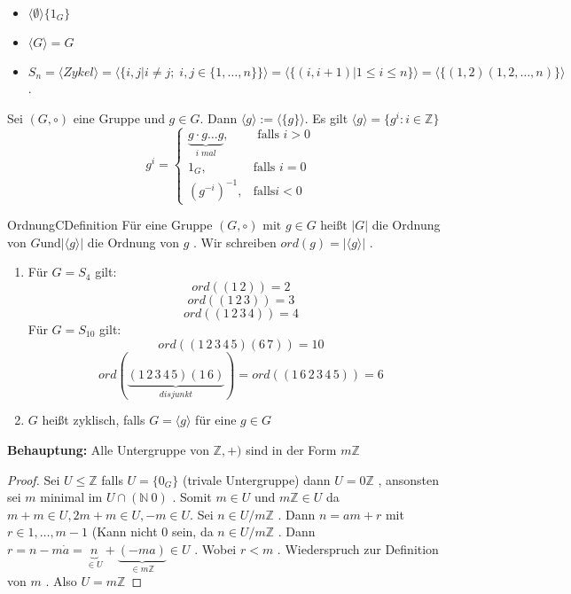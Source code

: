 \documentclass[a4paper]{memoir}
\begin{document}
\begin{itemize}

    \item $ \langle \emptyset  \rangle \{1_G\} $
    \item $ \langle G \rangle = G $
    \item $ S_n = \langle Zykel \rangle = \langle \{ i,j | i \neq j ; \;  i,j \in \{1,\dots,n\}\} \rangle = \langle \{(i,i+1)|1 \leq i \leq n\} \rangle = \langle \{(1,2)(1,2,\dots ,n)\} \rangle $ . 
\end{itemize}
\vspace{2em}
        Sei $ (G, \circ) $ eine Gruppe und $ g \in G $. Dann $ \langle g \rangle := \langle \{g\} \rangle  $. Es gilt $ \langle g \rangle = \{g^i:i \in \mathbb{Z}\} $ 
            $$ g^i = \begin{cases}
                \underbrace{ g \cdot g \dots g}_{i\; mal}, & \text{ falls } i > 0 \\
                1_G, & \text{falls } i = 0 \\
                (g^{-i})^{-1},& \text{falls} i<0    
            \end{cases}
             $$ 
\begin{ibox}{1.8}{Ordnung}{CDefinition}
    Für eine Gruppe $ (G, \circ) \text{ mit } g \in G \text{ heißt } |G| $ die Ordnung von $ G \text{und} | \langle g \rangle |  $ die Ordnung von $ g $ . Wir schreiben $ ord(g) = | \langle g \rangle | $ . 
\end{ibox}
\begin{enumerate}[label=\alph*)]
    \item Für $ G=S_4 $ gilt:
        $$ ord((1\,2))=2 $$
        $$ ord((1\,2\,3)) = 3 $$
        $$ ord((1\,2\,3\,4)) = 4 $$
        Für $ G=S_{10} $ gilt:
         $$ ord((1\,2\,3\,4\,5)(6\,7))=10 $$
         $$ ord(\underbrace{ (1\,2\,3\,4\,5)(1\,6)}_{disjunkt}) = ord((1\,6\,2\,3\,4\,5))= 6$$
     \item $ G $ heißt zyklisch, falls $ G= \langle g \rangle $ für eine $ g \in G $    
         $  $ 
          
\end{enumerate}
\vspace{1em}
\textbf{Behauptung: } Alle Untergruppe von $ \mathbb{Z}, +) $ sind in der Form $ m \mathbb{Z} $ 

\begin{proof}
    Sei $ U \leq \mathbb{Z} $ falls $ U = \{0_G\} $ (trivale Untergruppe)
    dann $ U = 0 \mathbb{Z} $ , ansonsten sei $ m $ minimal im $ U \cap ( \mathbb{N} \ 0) $ . Somit $ m \in U $ und $ m \mathbb{Z} \in U $ da $ m + m \in U, 2m + m \in U, -m \in U $. 
    \newline
    Sei $ n \in U/ m \mathbb{Z} $ . Dann $ n = am + r $ mit $ r \in {1,\dots, m-1}  $ (Kann nicht $ 0 $ sein, da $ n \in U/m \mathbb{Z} $ . Dann $ r = n - m \dot a = \underbrace{n}_{\in U} + \underbrace{(-ma)}_{\in m \mathbb{Z}} \in U $ . Wobei $ r < m $ . Wiederspruch zur Definition von $ m $ . Also $ U = m \mathbb{Z} $    
    
\end{proof}
\end{document}
